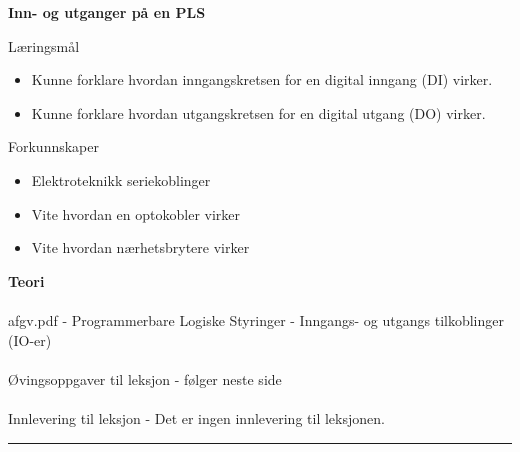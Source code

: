 \centerline{\bf Inn- og utganger på en PLS}  \bigskip
	Læringsmål
	\begin{itemize}[noitemsep]
		\item Kunne forklare hvordan inngangskretsen for en digital inngang (DI) virker. 
		\item Kunne forklare hvordan utgangskretsen for en digital utgang (DO) virker. 
	\end{itemize}

	Forkunnskaper

	\begin{itemize}[noitemsep]
		\item Elektroteknikk seriekoblinger
		\item Vite hvordan en optokobler virker
		\item Vite hvordan nærhetsbrytere virker

	\end{itemize}
\textbf{Teori}\\\\
afgv.pdf - Programmerbare Logiske Styringer - Inngangs- og utgangs tilkoblinger (IO-er)\\\\
Øvingsoppgaver til leksjon - følger neste side\\\\
Innlevering til leksjon - Det er ingen innlevering til leksjonen. 
\bigskip 
\hrule
\vfil \eject
